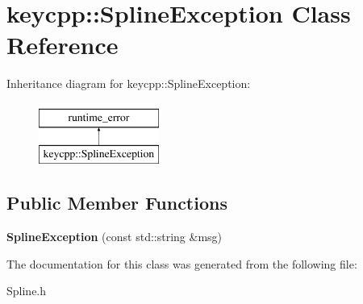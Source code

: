 \hypertarget{classkeycpp_1_1_spline_exception}{\section{keycpp\-:\-:Spline\-Exception Class Reference}
\label{classkeycpp_1_1_spline_exception}
}
Inheritance diagram for keycpp\-:\-:Spline\-Exception\-:\begin{figure}[H]
\begin{center}
\leavevmode
\includegraphics[height=2.000000cm]{classkeycpp_1_1_spline_exception}
\end{center}
\end{figure}
\subsection*{Public Member Functions}
\begin{DoxyCompactItemize}
\item 
\hypertarget{classkeycpp_1_1_spline_exception_a7c13b157534ec469e0b735c071192df8}{{\bfseries Spline\-Exception} (const std\-::string \&msg)}\label{classkeycpp_1_1_spline_exception_a7c13b157534ec469e0b735c071192df8}

\end{DoxyCompactItemize}


The documentation for this class was generated from the following file\-:\begin{DoxyCompactItemize}
\item 
Spline.\-h\end{DoxyCompactItemize}
